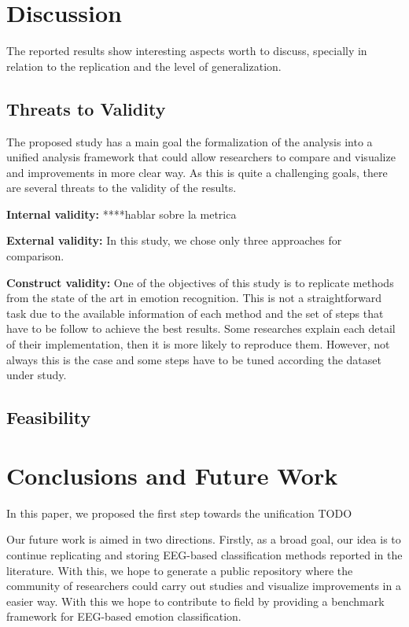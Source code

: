 \documentclass{sig-alternate}
\begin{document}
\section{Discussion}
\label{discussion}

The reported results show interesting aspects worth to discuss, specially 
in relation to the replication and the level of generalization.


\subsection{Threats to Validity}

The proposed  study has a main goal the formalization
of the analysis into a unified analysis framework 
that could allow researchers to compare and
visualize and improvements in more clear way. 
As this is quite a challenging goals, there are several
threats to the validity of the results. 

\textbf{Internal validity: }  ****hablar sobre la metrica

\textbf{External validity: } In this study, we chose only three approaches
for comparison. 

\textbf{Construct validity: } One of the objectives of this study is 
to replicate methods from the state of the art in emotion recognition.
This is not a straightforward task due to the available information of each method 
and the set of steps that have to be follow to achieve the best results.
Some researches explain each detail of their implementation, then it is more 
likely to reproduce them. However, not always this is the case and some steps 
have to be tuned according the dataset under study.    


\subsection{Feasibility}


\section{Conclusions and  Future Work}
\label{conclusion}

In this paper, we proposed the first step towards the unification  TODO


Our future work is aimed in two directions. Firstly, as a broad
goal, our idea is to continue replicating and  storing EEG-based 
classification methods reported in the literature. With this, we hope
to generate a public repository where the community of researchers
could carry out studies and visualize improvements in  a easier way. 
With this we hope to contribute to field by providing a benchmark
framework for EEG-based emotion classification.
\end{document}
